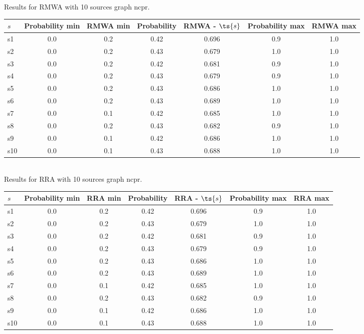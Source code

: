 \documentclass{article}
\begin{document}
\noindent Results for RMWA with 10 sources graph ncpr.

\noindent\begin{tabular}{|l|c|c|c|c|c|c|}
\hline
$s$& Probability min & RMWA min & Probability & RMWA - $\ts{s}$ & Probability max & RMWA max\\
\hline
s1 &0.0 & 0.2 & 0.42 & 0.696 & 0.9 & 1.0\\
\hline
s2 &0.0 & 0.2 & 0.43 & 0.679 & 1.0 & 1.0\\
\hline
s3 &0.0 & 0.2 & 0.42 & 0.681 & 0.9 & 1.0\\
\hline
s4 &0.0 & 0.2 & 0.43 & 0.679 & 0.9 & 1.0\\
\hline
s5 &0.0 & 0.2 & 0.43 & 0.686 & 1.0 & 1.0\\
\hline
s6 &0.0 & 0.2 & 0.43 & 0.689 & 1.0 & 1.0\\
\hline
s7 &0.0 & 0.1 & 0.42 & 0.685 & 1.0 & 1.0\\
\hline
s8 &0.0 & 0.2 & 0.43 & 0.682 & 0.9 & 1.0\\
\hline
s9 &0.0 & 0.1 & 0.42 & 0.686 & 1.0 & 1.0\\
\hline
s10 &0.0 & 0.1 & 0.43 & 0.688 & 1.0 & 1.0\\
\hline
\end{tabular}\\

\noindent Results for RRA with 10 sources graph ncpr.

\noindent\begin{tabular}{|l|c|c|c|c|c|c|}
\hline
$s$& Probability min & RRA min & Probability & RRA - $\ts{s}$ & Probability max & RRA max\\
\hline
s1 &0.0 & 0.2 & 0.42 & 0.696 & 0.9 & 1.0\\
\hline
s2 &0.0 & 0.2 & 0.43 & 0.679 & 1.0 & 1.0\\
\hline
s3 &0.0 & 0.2 & 0.42 & 0.681 & 0.9 & 1.0\\
\hline
s4 &0.0 & 0.2 & 0.43 & 0.679 & 0.9 & 1.0\\
\hline
s5 &0.0 & 0.2 & 0.43 & 0.686 & 1.0 & 1.0\\
\hline
s6 &0.0 & 0.2 & 0.43 & 0.689 & 1.0 & 1.0\\
\hline
s7 &0.0 & 0.1 & 0.42 & 0.685 & 1.0 & 1.0\\
\hline
s8 &0.0 & 0.2 & 0.43 & 0.682 & 0.9 & 1.0\\
\hline
s9 &0.0 & 0.1 & 0.42 & 0.686 & 1.0 & 1.0\\
\hline
s10 &0.0 & 0.1 & 0.43 & 0.688 & 1.0 & 1.0\\
\hline
\end{tabular}\\
\end{document}
